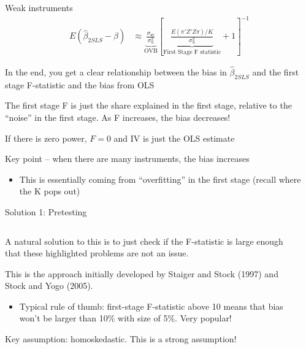 \documentclass[notes,11pt, aspectratio=169]{beamer}
\newenvironment{wideitemize}{\itemize\addtolength{\itemsep}{10pt}}{\enditemize}
\begin{document}
\begin{frame}{Weak instruments}
    \begin{align*}
      E(\hat{\beta}_{2SLS} - \beta) &\approx \underbrace{\frac{\sigma_{u\epsilon}}{\sigma^{2}_{u}}}_{\text{OVB}}\left[\underbrace{\frac{E(\pi'Z'Z\pi)/K}{\sigma^{2}_{u}}}_{\text{First Stage  F statistic}} + 1\right]^{-1}
    \end{align*}
  \begin{wideitemize}
  \item In the end, you get a clear relationship between the bias in
    $\hat{\beta}_{2SLS}$ and the first stage F-statistic and the bias from OLS
  \item The first stage F is just the share explained in the first
    stage, relative to the ``noise'' in the first stage. As F increases, the bias decreases!
  \item If there is zero power, $F = 0$ and IV is just the OLS estimate
  \item Key point -- when there are many instruments, the bias increases
    \begin{itemize}
    \item This is essentially coming from ``overfitting'' in the first
      stage (recall where the K pops out)
    \end{itemize}
  \end{wideitemize}
\end{frame}


\begin{frame}{Solution 1: Pretesting}
  \begin{columns}[T] %
    \begin{column}{0.5\textwidth}
      \begin{wideitemize}
      \item A natural solution to this is to just check if the F-statistic is large enough that these highlighted problems are not an issue.
      \item This is the approach initially developed by Staiger and Stock
        (1997) and Stock and Yogo (2005).
        \begin{itemize}
        \item Typical rule of thumb: first-stage F-statistic above 10 means that bias won't be larger than 10\% with size of 5\%. Very popular!
        \end{itemize}
      \item Key assumption: homoskedastic. This is a strong assumption!
      \end{wideitemize}
    \end{column}
    \begin{column}{0.5\textwidth}
    \end{column}
  \end{columns}
\end{frame}
\end{document}
